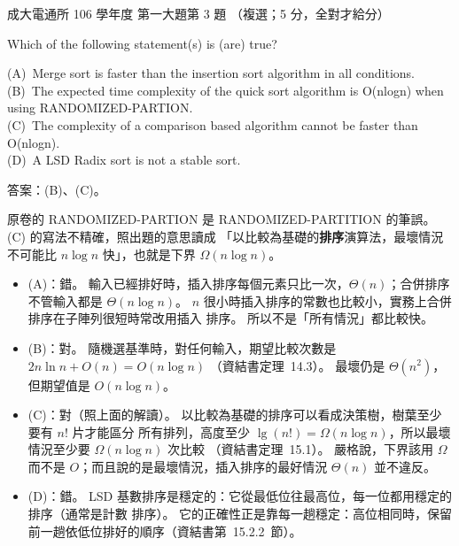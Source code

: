 \begin{pastexam}[label={px:ncku-106-cce-ds-03}]{成大電通所 106 學年度 第一大題第 3 題}
（複選；5 分，全對才給分）

Which of the following statement(s) is (are) true?

(A)~Merge sort is faster than the insertion sort algorithm in all conditions.\\
(B)~The expected time complexity of the quick sort algorithm is O(nlogn) when using
RANDOMIZED-PARTION.\\
(C)~The complexity of a comparison based algorithm cannot be faster than O(nlogn).\\
(D)~A LSD Radix sort is not a stable sort.
\end{pastexam}

\begin{pastsoln}
答案：(B)、(C)。

原卷的 RANDOMIZED-PARTION 是 RANDOMIZED-PARTITION 的筆誤。 (C) 的寫法不精確，照出題的意思讀成
「以比較為基礎的\textbf{排序}演算法，最壞情況不可能比 $n \log n$ 快」，也就是下界 $\Omega(n \log n)$。

\begin{itemize}
\item (A)：錯。 輸入已經排好時，插入排序每個元素只比一次，$\Theta(n)$；合併排序不管輸入都是
$\Theta(n \log n)$。 $n$ 很小時插入排序的常數也比較小，實務上合併排序在子陣列很短時常改用插入
排序。 所以不是「所有情況」都比較快。
\item (B)：對。 隨機選基準時，對任何輸入，期望比較次數是 $2n \ln n + O(n) = O(n \log n)$
（資結書定理~14.3）。 最壞仍是 $\Theta(n^2)$，但期望值是 $O(n \log n)$。
\item (C)：對（照上面的解讀）。 以比較為基礎的排序可以看成決策樹，樹葉至少要有 $n!$ 片才能區分
所有排列，高度至少 $\lg(n!) = \Omega(n \log n)$，所以最壞情況至少要 $\Omega(n \log n)$ 次比較
（資結書定理~15.1）。 嚴格說，下界該用 $\Omega$ 而不是 $O$；而且說的是最壞情況，插入排序的最好情況
$\Theta(n)$ 並不違反。
\item (D)：錯。 LSD 基數排序是穩定的：它從最低位往最高位，每一位都用穩定的排序（通常是計數
排序）。 它的正確性正是靠每一趟穩定：高位相同時，保留前一趟依低位排好的順序（資結書第~15.2.2~節）。
\end{itemize}
\end{pastsoln}
